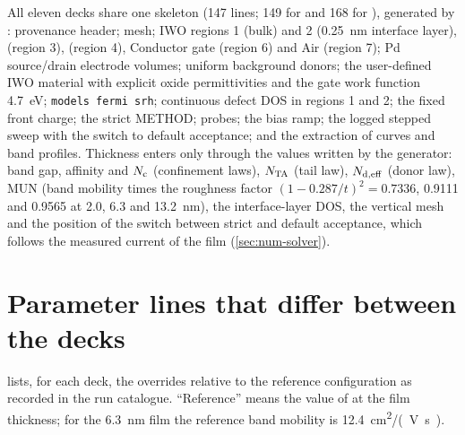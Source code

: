All eleven decks share one skeleton (147 lines; 149 for  and 168 for ), generated by
: provenance header; mesh; IWO regions 1 (bulk) and 2 (\SI{0.25}{nm} interface layer),
\AlO{} (region 3), \HfO{} (region 4), Conductor gate (region 6) and Air (region 7); Pd source/drain electrode volumes;
uniform background donors; the user-defined IWO material with explicit oxide permittivities and the gate work function
\SI{4.7}{eV}; \texttt{models fermi srh}; continuous defect DOS in regions 1 and 2; the fixed front charge; the strict
METHOD; probes; the bias ramp; the logged stepped sweep with the switch to default acceptance; and the extraction of
curves and band profiles. Thickness enters only through the values written by the generator: band gap, affinity and
$N_{\mathrm{c}}$ (confinement laws), $N_{\mathrm{TA}}$ (tail law), $N_{\mathrm{d,eff}}$ (donor law), MUN (band mobility times the roughness factor
$(1-0.287/t)^2 = 0.7336$, 0.9111 and 0.9565 at 2.0, 6.3 and \SI{13.2}{nm}), the interface-layer DOS, the vertical mesh
and the position of the switch between strict and default acceptance, which follows the measured current of the film
(\cref{sec:num-solver}).

\section{Parameter lines that differ between the decks}\label{sec:decks-diff}

 lists, for each deck, the overrides relative to the reference configuration as recorded in the run
catalogue. ``Reference'' means the value of  at the film thickness; for the
\SI{6.3}{nm} film the reference band mobility is \SI{12.4}{cm^2/(V.s)}.


